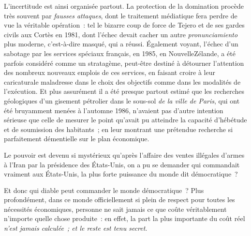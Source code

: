 \documentclass[french,twoside]{book} %
\def\mednobreak{\ifdim\lastskip<\medskipamount
  \removelastskip\nopagebreak\medskip\fi}
\newcommand{\labelblock}[1]{\medbreak{\noindent\color{rubric}\bfseries #1}\par\mednobreak}
\begin{document}
L’incertitude est ainsi organisée partout. La protection de la domination procède très souvent par \emph{fausses attaques}, dont le traitement médiatique fera perdre de vue la véritable opération : tel le bizarre coup de force de Tejero et de ses gardes civils aux Cortès en 1981, dont l’échec devait cacher un autre \emph{pronunciamiento} plus moderne, c’est-à-dire masqué, qui a réussi. Également voyant, l’échec d’un sabotage par les services spéciaux français, en 1985, en NouvelleZélande, a été parfois considéré comme un stratagème, peut-être destiné à détourner l’attention des nombreux nouveaux emplois de ces services, en faisant croire à leur caricaturale maladresse dans le choix des objectifs comme dans les modalités de l’exécution. Et plus assurément il a été presque partout estimé que les recherches géologiques d’un gisement pétrolier dans le sous-sol \emph{de la ville de Paris}, qui ont été bruyamment menées à l’automne 1986, n’avaient pas d’autre intention sérieuse que celle de mesurer le point qu’avait pu atteindre la capacité d’hébétude et de soumission des habitants ; en leur montrant une prétendue recherche si parfaitement démentielle sur le plan économique.\par
Le pouvoir est devenu si mystérieux qu’après l’affaire des ventes illégales d’armes à l’Iran par la présidence des États-Unis, on a pu se demander qui commandait vraiment aux États-Unis, la plus forte puissance du monde dit démocratique ?\par
Et donc qui diable peut commander le monde démocratique ? Plus profondément, dans ce monde officiellement si plein de respect pour toutes les nécessités économiques, personne ne sait jamais ce que coûte véritablement n’importe quelle chose produite : en effet, la part la plus importante du coût réel \emph{n’est jamais calculée ; et le reste est tenu secret}.\par

\labelblock{XIX}
\end{document}
